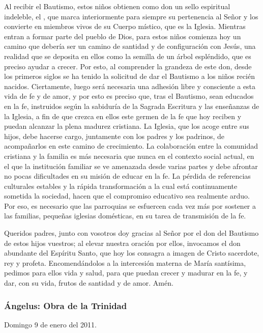 \begin{body}
\begin{body}
{Al recibir el Bautismo, estos niños obtienen como don un sello espiritual indeleble, el , que marca interiormente para siempre su pertenencia al Señor y los convierte en miembros vivos de su Cuerpo místico, que es la Iglesia. Mientras entran a formar parte del pueblo de Dios, para estos niños comienza hoy un camino que debería ser un camino de santidad y de configuración con Jesús, una realidad que se deposita en ellos como la semilla de un árbol espléndido, que es preciso ayudar a crecer. Por esto, al comprender la grandeza de este don, desde los primeros siglos se ha tenido la solicitud de dar el Bautismo a los niños recién nacidos. Ciertamente, luego será necesaria una adhesión libre y consciente a esta vida de fe y de amor, y por esto es preciso que, tras el Bautismo, sean educados en la fe, instruidos según la sabiduría de la Sagrada Escritura y las enseñanzas de la Iglesia, a fin de que crezca en ellos este germen de la fe que hoy reciben y puedan alcanzar la plena madurez cristiana. La Iglesia, que los acoge entre sus hijos, debe hacerse cargo, juntamente con los padres y los padrinos, de acompañarlos en este camino de crecimiento. La colaboración entre la comunidad cristiana y la familia es más necesaria que nunca en el contexto social actual, en el que la institución familiar se ve amenazada desde varias partes y debe afrontar no pocas dificultades en su misión de educar en la fe. La pérdida de referencias culturales estables y la rápida transformación a la cual está continuamente sometida la sociedad, hacen que el compromiso educativo sea realmente arduo. Por eso, es necesario que las parroquias se esfuercen cada vez más por sostener a las familias, pequeñas iglesias domésticas, en su tarea de transmisión de la fe.

Queridos padres, junto con vosotros doy gracias al Señor por el don del Bautismo de estos hijos vuestros; al elevar nuestra oración por ellos, invocamos el don abundante del Espíritu Santo, que hoy los consagra a imagen de Cristo sacerdote, rey y profeta. Encomendándolos a la intercesión materna de María santísima, pedimos para ellos vida y salud, para que puedan crecer y madurar en la fe, y dar, con su vida, frutos de santidad y de amor. Amén.

\subsubsection{Ángelus: Obra de la Trinidad}

Domingo 9 de enero del 2011.

}
\end{body}
\end{body}
